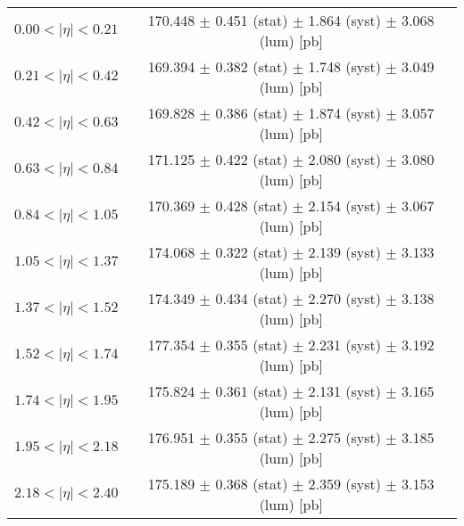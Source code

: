 \begin{tabular}{lc}
\hline
$0.00 < |\eta| <0.21$          & 170.448 $\pm$ 0.451 (stat) $\pm$ 1.864 (syst) $\pm$ 3.068 (lum) [pb]  \\
$0.21 < |\eta| <0.42$          & 169.394 $\pm$ 0.382 (stat) $\pm$ 1.748 (syst) $\pm$ 3.049 (lum) [pb]  \\
$0.42 < |\eta| <0.63$          & 169.828 $\pm$ 0.386 (stat) $\pm$ 1.874 (syst) $\pm$ 3.057 (lum) [pb]  \\
$0.63 < |\eta| <0.84$          & 171.125 $\pm$ 0.422 (stat) $\pm$ 2.080 (syst) $\pm$ 3.080 (lum) [pb]  \\
$0.84 < |\eta| <1.05$          & 170.369 $\pm$ 0.428 (stat) $\pm$ 2.154 (syst) $\pm$ 3.067 (lum) [pb]  \\
$1.05 < |\eta| <1.37$          & 174.068 $\pm$ 0.322 (stat) $\pm$ 2.139 (syst) $\pm$ 3.133 (lum) [pb]  \\
$1.37 < |\eta| <1.52$          & 174.349 $\pm$ 0.434 (stat) $\pm$ 2.270 (syst) $\pm$ 3.138 (lum) [pb]  \\
$1.52 < |\eta| <1.74$          & 177.354 $\pm$ 0.355 (stat) $\pm$ 2.231 (syst) $\pm$ 3.192 (lum) [pb]  \\
$1.74 < |\eta| <1.95$          & 175.824 $\pm$ 0.361 (stat) $\pm$ 2.131 (syst) $\pm$ 3.165 (lum) [pb]  \\
$1.95 < |\eta| <2.18$          & 176.951 $\pm$ 0.355 (stat) $\pm$ 2.275 (syst) $\pm$ 3.185 (lum) [pb]  \\
$2.18 < |\eta| <2.40$          & 175.189 $\pm$ 0.368 (stat) $\pm$ 2.359 (syst) $\pm$ 3.153 (lum) [pb]  \\
\hline
\end{tabular}
